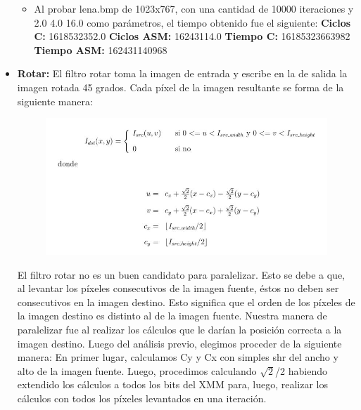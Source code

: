 \documentclass[10pt, a4paper]{article}
\begin{document}
\begin{itemize}
\begin{itemize}
\item{Al probar lena.bmp de 1023x767, con una cantidad de 10000 iteraciones y 2.0 4.0 16.0 como parámetros, el tiempo obtenido fue el siguiente:\newline
\newline
\textbf{Ciclos C:}                  1618532352.0\newline
\vspace{0.15cm}
\textbf{Ciclos ASM:}               16243114.0\newline
\textbf{Tiempo C:}                 16185323663982\newline
\textbf{Tiempo ASM:}               162431140968\newline}

\end{itemize}
\item {\textbf{Rotar:}} 
El filtro rotar toma la imagen de entrada y escribe en la de salida la imagen rotada 45 grados. Cada píxel de la imagen resultante se forma de la siguiente manera:
\begin{figure}[H] %
\begin{center}
\includegraphics[width=400pt]{./rotar.jpg}
\end{center}
\end{figure}
El filtro rotar no es un buen candidato para paralelizar. Esto se debe a que, al levantar los píxeles consecutivos de la imagen fuente, éstos no deben ser consecutivos en la imagen destino. Esto significa que el orden de los píxeles de la imagen destino es distinto al de la imagen fuente. Nuestra manera de paralelizar fue al realizar los cálculos que le darían la posición correcta a la imagen destino.\newline
Luego del análisis previo, elegimos proceder de la siguiente manera:\newline
En primer lugar, calculamos Cy y Cx con simples shr del ancho y alto de la imagen fuente. Luego, procedimos calculando $\sqrt{2}$/2 habiendo extendido los cálculos a todos los bits del XMM para, luego, realizar los cálculos con todos los píxeles levantados en una iteración.\newline

\end{itemize}
\end{document}
